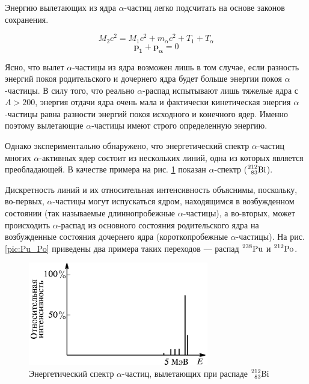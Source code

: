 \documentclass[a4paper,12pt]{article}
\begin{document}
Энергию вылетающих из ядра $\alpha$-частиц легко подсчитать на основе законов сохранения.

\begin{equation}\label{eq:1}
    M_2 c^2 =M_1 c^2 + m_\alpha c^2 + T_1 + T_\alpha
\end{equation}
\begin{equation}\label{eq:2}
    \mathbf{p_1} + \mathbf{p_\alpha} = 0
\end{equation}

Ясно, что вылет $\alpha$-частицы из ядра возможен лишь в том случае, если разность энергий покоя родительского и дочернего ядра будет больше энергии покоя $\alpha$-частицы. В силу того, что реально $\alpha$-распад испытывают лишь тяжелые ядра с $A > 200$, энергия отдачи ядра очень мала и фактически кинетическая энергия $\alpha$-частицы равна разности энергий покоя исходного и конечного ядер. Именно поэтому вылетающие $\alpha$-частицы имеют строго определенную энергию.


Однако экспериментально обнаружено, что энергетический спектр $\alpha$-частиц многих $\alpha$-активных ядер состоит из нескольких линий, одна из которых является преобладающей. В качестве примера на рис. \ref{pic:spectre} показан $\alpha$-спектр ($\prescript{212}{83}{\text{Bi}}$).


Дискретность линий и их относительная интенсивность объяснимы, поскольку, во-первых, $\alpha$-частицы могут испускаться ядром, находящимся в возбужденном состоянии (так называемые длиннопробежные $\alpha$-частицы), а во-вторых, может происходить $\alpha$-распад из основного состояния родительского ядра на возбужденные состояния дочернего ядра (короткопробежные $\alpha$-частицы). На рис. \ref{pic:Pu_Po} приведены два примера таких переходов — распад $\prescript{238}{}{\text{Pu}}$ и $\prescript{212}{}{\text{Po}}$.

\FloatBarrier
\begin{figure}[h]
    \begin{center}
        \includegraphics[width = 0.7\textwidth]{pics/spectre.png}
        \caption{Энергетический спектр $\alpha$-частиц, вылетающих при распаде $\prescript{212}{83}{\text{Bi}}$}
    \label{pic:spectre}
    \end{center}
\end{figure}
\FloatBarrier
\end{document}
